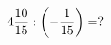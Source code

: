 \documentclass[preview]{standalone}
\begin{document}
\begin{align*}
4 { 10 \over 15 }  :  \left( - { 1 \over 15 } \right)  =  ?
\end{align*}
\end{document}
